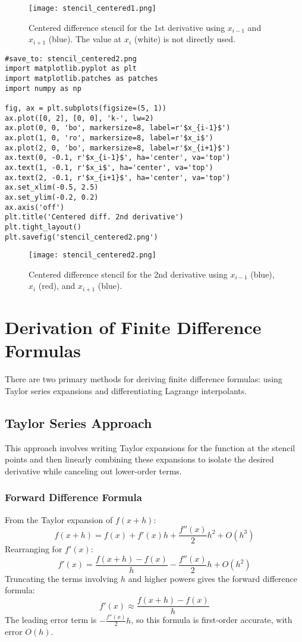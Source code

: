 \documentclass{article}
\begin{document}
\begin{figure}[H]
\centering
\texttt{[image: stencil\_centered1.png]}
\caption{Centered difference stencil for the 1st derivative using $x_{i-1}$ and $x_{i+1}$ (blue). The value at $x_i$ (white) is not directly used.}
\label{fig:stencil_centered1}
\end{figure}

\begin{verbatim}
#save_to: stencil_centered2.png
import matplotlib.pyplot as plt
import matplotlib.patches as patches
import numpy as np

fig, ax = plt.subplots(figsize=(5, 1))
ax.plot([0, 2], [0, 0], 'k-', lw=2)
ax.plot(0, 0, 'bo', markersize=8, label=r'$x_{i-1}$')
ax.plot(1, 0, 'ro', markersize=8, label=r'$x_i$')
ax.plot(2, 0, 'bo', markersize=8, label=r'$x_{i+1}$')
ax.text(0, -0.1, r'$x_{i-1}$', ha='center', va='top')
ax.text(1, -0.1, r'$x_i$', ha='center', va='top')
ax.text(2, -0.1, r'$x_{i+1}$', ha='center', va='top')
ax.set_xlim(-0.5, 2.5)
ax.set_ylim(-0.2, 0.2)
ax.axis('off')
plt.title('Centered diff. 2nd derivative')
plt.tight_layout()
plt.savefig('stencil_centered2.png')
\end{verbatim}

\begin{figure}[H]
\centering
\texttt{[image: stencil\_centered2.png]}
\caption{Centered difference stencil for the 2nd derivative using $x_{i-1}$ (blue), $x_i$ (red), and $x_{i+1}$ (blue).}
\label{fig:stencil_centered2}
\end{figure}

\section{Derivation of Finite Difference Formulas}

There are two primary methods for deriving finite difference formulas: using Taylor series expansions and differentiating Lagrange interpolants.

\subsection{Taylor Series Approach}

This approach involves writing Taylor expansions for the function at the stencil points and then linearly combining these expansions to isolate the desired derivative while canceling out lower-order terms.

\subsubsection{Forward Difference Formula}
From the Taylor expansion of $f(x+h)$:
\[
f(x+h) = f(x) + f'(x)h + \frac{f''(x)}{2}h^2 + O(h^3)
\]
Rearranging for $f'(x)$:
\[
f'(x) = \frac{f(x+h) - f(x)}{h} - \frac{f''(x)}{2}h + O(h^2)
\]
Truncating the terms involving $h$ and higher powers gives the forward difference formula:
\[
f'(x) \approx \frac{f(x+h) - f(x)}{h}
\]
The leading error term is $-\frac{f''(x)}{2}h$, so this formula is first-order accurate, with error $O(h)$.
\end{document}
